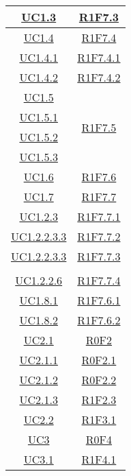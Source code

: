 \begin{longtable}{|c|c|}
	\hyperlink{UC1.3}{UC1.3} & \hyperlink{R1F7.3}{R1F7.3} \\
	\hline
	\hyperlink{UC1.4}{UC1.4} & \hyperlink{R1F7.4}{R1F7.4} \\
	\hline
	\hyperlink{UC1.4.1}{UC1.4.1} & \hyperlink{R1F7.4.1}{R1F7.4.1}\\
	\hline
	\hyperlink{UC1.4.2}{UC1.4.2} & \hyperlink{R1F7.4.2}{R1F7.4.2}\\
	\hline
	\hyperlink{UC1.5}{UC1.5} & \multirow{4}{*}{\hyperlink{R1F7.5}{R1F7.5}}\\
	\hyperlink{UC1.5.1}{UC1.5.1} &\\
	\hyperlink{UC1.5.2}{UC1.5.2} &\\
	\hyperlink{UC1.5.3}{UC1.5.3} &\\
	\hline
	\hyperlink{UC1.6}{UC1.6} & \hyperlink{R1F7.6}{R1F7.6} \\
	\hline
	\hyperlink{UC1.7}{UC1.7} & \hyperlink{R1F7.7}{R1F7.7}\\
	\hline
	\hyperlink{UC1.2.3}{UC1.2.3} & \hyperlink{R1F7.7.1}{R1F7.7.1} \\
	\hline
	\hyperlink{UC1.2.2.3.3}{UC1.2.2.3.3} & \hyperlink{R1F7.7.2}{R1F7.7.2} \\
	\hline
	\hyperlink{UC1.2.2.3.3}{UC1.2.2.3.3} & \hyperlink{R1F7.7.3}{R1F7.7.3}\\
	\hline
	\begin{tabular}{c}
		\hyperlink{UC1.2.2.5}{UC1.2.2.5} \\ \hyperlink{UC1.2.2.6}{UC1.2.2.6}
	\end{tabular} & \hyperlink{R1F7.7.4}{R1F7.7.4}\\
	\hline
	\hyperlink{UC1.8.1}{UC1.8.1} & \hyperlink{R1F7.6.1}{R1F7.6.1} \\
	\hline
	\hyperlink{UC1.8.2}{UC1.8.2} & \hyperlink{R1F7.6.2}{R1F7.6.2} \\
	\hline
	\hyperlink{UC2.1}{UC2.1} & \hyperlink{R0F2}{R0F2}\\
	\hline
	\hyperlink{UC2.1.1}{UC2.1.1} & \hyperlink{R0F2.1}{R0F2.1}\\
	\hline
	\hyperlink{UC2.1.2}{UC2.1.2} & \hyperlink{R0F2.2}{R0F2.2}\\
	\hline
	\hyperlink{UC2.1.3}{UC2.1.3} & \hyperlink{R1F2.3}{R1F2.3}\\
	\hline
	\hyperlink{UC2.2}{UC2.2} & \hyperlink{R1F3.1}{R1F3.1}\\
	\hline
	\hyperlink{UC3}{UC3} & \hyperlink{R0F4}{R0F4}\\
	\hline
	\hyperlink{UC3.1}{UC3.1} & \hyperlink{R1F4.1}{R1F4.1}\\

\end{longtable}
